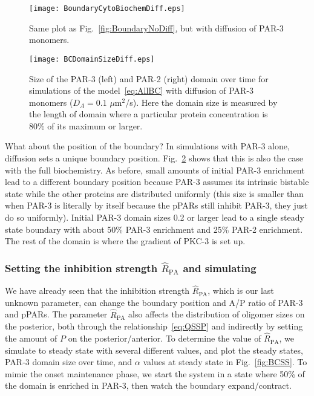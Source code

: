 \documentclass[11pt]{article}
\newcommand{\6}[1]{#1_{\text{6}}}
\newcommand{\3}[1]{#1_{\text{3}}}
\begin{document}
\begin{figure}
\centering
\texttt{[image: BoundaryCytoBiochemDiff.eps]}
\caption{\label{fig:BoundaryDiff}Same plot as Fig.\ \ref{fig:BoundaryNoDiff}, but with diffusion of PAR-3 monomers. }
\end{figure}

\begin{figure}
\centering
\texttt{[image: BCDomainSizeDiff.eps]}
\caption{\label{fig:BCDSD} Size of the PAR-3 (left) and PAR-2 (right) domain over time for simulations of the model\ \eqref{eq:AllBC} with diffusion of PAR-3 monomers ($D_A=0.1$ $\mu$m$^2$/s). Here the domain size is measured by the length of domain where a particular protein concentration is 80\% of its maximum or larger. }
\end{figure}


What about the position of the boundary? In simulations with PAR-3 alone, diffusion sets a unique boundary position. Fig.\ \ref{fig:BCDSD} shows that this is also the case with the full biochemistry. As before, small amounts of initial PAR-3 enrichment lead to a different boundary position because PAR-3 assumes its intrinsic bistable state while the other proteins are distributed uniformly (this size is smaller than when PAR-3 is literally by itself because the pPARs still inhibit PAR-3, they just do so uniformly). Initial PAR-3 domain sizes 0.2 or larger lead to a single steady state boundary with about 50\% PAR-3 enrichment and 25\% PAR-2 enrichment. The rest of the domain is where the gradient of PKC-3 is set up.



\subsubsection{Setting the inhibition strength $\hat R_\text{PA}$ and simulating}
We have already seen that the inhibition strength $\hat R_\text{PA}$, which is our last unknown parameter, can change the boundary position and A/P ratio of PAR-3 and pPARs. The parameter $\hat R_\text{PA}$ also affects the distribution of oligomer sizes on the posterior, both through the relationship\ \eqref{eq:QSSP} and indirectly by setting the amount of $P$ on the posterior/anterior. To determine the value of $\hat R_\text{PA}$, we simulate to steady state with several different values, and plot the steady states, PAR-3 domain size over time, and $\alpha$ values at steady state in Fig.\ \ref{fig:BCSS}. To mimic the onset maintenance phase, we start the system in a state where 50\% of the domain is enriched in PAR-3, then watch the boundary expand/contract.
\end{document}
